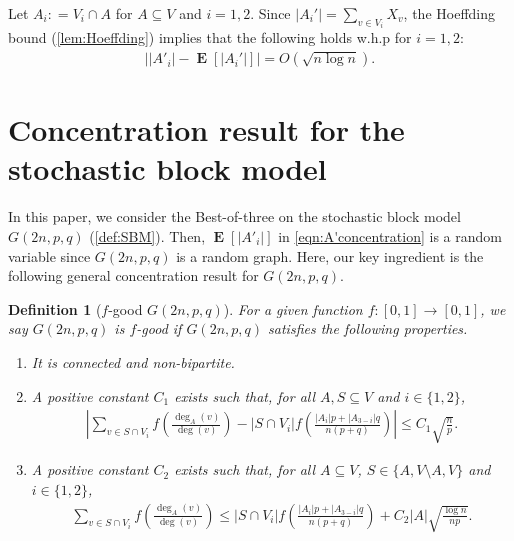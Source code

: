 \documentclass[letterpaper,11pt]{article}
\newtheorem{definition}[theorem]{Definition}
\newcommand{\Tcons}{T_{\mathrm{cons}}}
\DeclareMathOperator{\E}{\mathbf{E}}
\def\defeq{\mathrel{\mathop:}=}%
\begin{document}
Let $A_i \defeq V_i\cap A$ for $A\subseteq V$ and $i=1,2$.
Since $|A_i'|=\sum_{v\in V_i}X_v$, the Hoeffding bound (\cref{lem:Hoeffding}) implies that the following holds w.h.p for $i=1,2$: 
\begin{align}
\left||A'_i|-\E[|A_i'|]\right|=O(\sqrt{n\log n}). \label{eqn:A'concentration}
\end{align}

%
\section{Concentration result for the stochastic block model}\label{sec:concentrationsbm}
%
In this paper, we consider the Best-of-three on the stochastic block model $G(2n,p,q)$ (\cref{def:SBM}). 
Then, $\E\left[|A'_i|\right]$ in \cref{eqn:A'concentration} is a random variable since $G(2n,p,q)$ is a random graph.
Here, our key ingredient is the following general concentration result for $G(2n,p,q)$. %
\begin{definition}[$f$-good $G(2n,p,q)$]
For a given function $f:[0,1]\to [0,1]$, we say $G(2n,p,q)$ is $f$-good if $G(2n,p,q)$ satisfies the following properties.
\begin{enumerate}[label={\rm (P\arabic*)}]
\setlength{\itemsep}{-1.8pt}
\item It is connected and non-bipartite. \label{pro:connectednonbipartite}
\item A positive constant $C_1$ exists such that, for all $A, S\subseteq V$ and $i\in\{1,2\}$, 
\begin{align*}
\left| \sum_{v\in S\cap V_i}f\left(\frac{\deg_A(v)}{\deg(v)}\right) - |S\cap V_i|f\left( \frac{|A_i|p+|A_{3-i}|q}{n(p+q)} \right) \right| \leq  C_1\sqrt{\frac{n}{p}}. 
\end{align*}
\label{pro:gomiN}
\item A positive constant $C_2$ exists such that, for all $A\subseteq V$, $S\in\{A, V\setminus A, V\}$ and $i\in\{1,2\}$, 
\begin{align*}
\sum_{v\in S\cap V_i}f\left(\frac{\deg_A(v)}{\deg(v)}\right) \leq 
|S\cap V_i|f\left( \frac{|A_i|p+|A_{3-i}|q}{n(p+q)} \right) + C_2|A|\sqrt{\frac{\log n}{np}}.
\end{align*}
\label{pro:gomiA}
\end{enumerate}
\end{definition}
\end{document}
